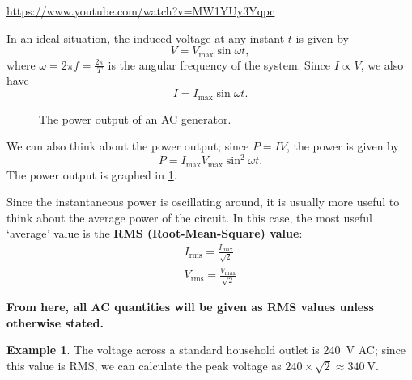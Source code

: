 \documentclass[a4paper]{amsbook}
\newcommand{\goandwatch}[1]{
\begin{center}
\begin{tcolorbox}[width=0.8\textwidth,colback={SkyBlue!20},title={\textbf{Go and watch...}},colbacktitle=MidnightBlue,coltitle=White]
  \textcolor{MidnightBlue}{\url{#1}}
\end{tcolorbox}
\end{center}}
\theoremstyle{definition}
\newtheorem*{example}{Example}
\numberwithin{exercise}{chapter}
\numberwithin{exercise}{chapter}
\begin{document}
\goandwatch{https://www.youtube.com/watch?v=MW1YUy3Yqpc}

In an ideal situation, the induced voltage at any instant $ t $ is given by
\begin{equation}
  V = V_\text{max} \sin \omega t,
\end{equation}
where $ \omega = 2\pi f = \frac{2\pi}{T} $ is the angular frequency of the system. Since $ I \propto V $, we also have
\begin{equation}
  I = I_\text{max} \sin \omega t.
\end{equation}

\begin{figure}
  \centering
  \caption{The power output of an AC generator.\label{fig:acpower}}
\end{figure}

We can also think about the power output; since $ P = IV $, the power is given by
\begin{equation}
  P = I_\text{max} V_\text{max} \sin^2 \omega t.
\end{equation}
The power output is graphed in \cref{fig:acpower}.

Since the instantaneous power is oscillating around, it is usually more useful to think about the average power of
the circuit. In this case, the most useful `average' value is the \textbf{RMS (Root-Mean-Square) value}:
\begin{gather}
  I_\text{rms} = \frac{I_\text{max}}{\sqrt{2}}\\
  V_\text{rms} = \frac{V_\text{max}}{\sqrt{2}}
\end{gather}

\textbf{\textcolor{WildStrawberry}{From here, all AC quantities will be given as RMS values unless otherwise stated.}}

\begin{example}
  The voltage across a standard household outlet is \SI{240}{\volt} AC; since this value is RMS, we can calculate the
  peak voltage as $ 240 \times \sqrt{2} \approx \SI{340}{\volt} $.
\end{example}
\end{document}

